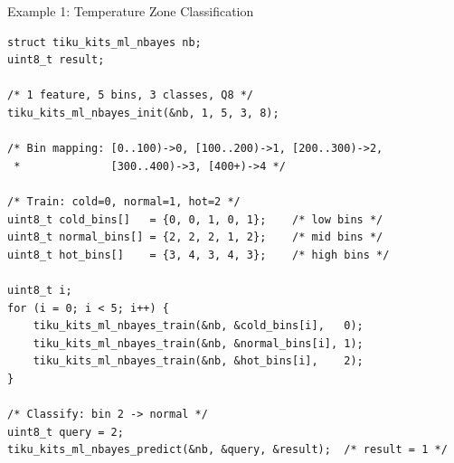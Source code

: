 \documentclass[aspectratio=169, 10pt]{beamer}
\begin{document}
\begin{frame}[fragile]{Example 1: Temperature Zone Classification}
\begin{lstlisting}[style=cstyle,
  title={examples/example\_ml\_nbayes.c --- 3 zones, 5 bins}]
struct tiku_kits_ml_nbayes nb;
uint8_t result;

/* 1 feature, 5 bins, 3 classes, Q8 */
tiku_kits_ml_nbayes_init(&nb, 1, 5, 3, 8);

/* Bin mapping: [0..100)->0, [100..200)->1, [200..300)->2,
 *              [300..400)->3, [400+)->4 */

/* Train: cold=0, normal=1, hot=2 */
uint8_t cold_bins[]   = {0, 0, 1, 0, 1};    /* low bins */
uint8_t normal_bins[] = {2, 2, 2, 1, 2};    /* mid bins */
uint8_t hot_bins[]    = {3, 4, 3, 4, 3};    /* high bins */

uint8_t i;
for (i = 0; i < 5; i++) {
    tiku_kits_ml_nbayes_train(&nb, &cold_bins[i],   0);
    tiku_kits_ml_nbayes_train(&nb, &normal_bins[i], 1);
    tiku_kits_ml_nbayes_train(&nb, &hot_bins[i],    2);
}

/* Classify: bin 2 -> normal */
uint8_t query = 2;
tiku_kits_ml_nbayes_predict(&nb, &query, &result);  /* result = 1 */
\end{lstlisting}
\end{frame}
\end{document}
